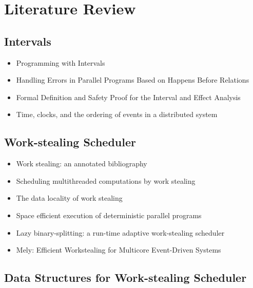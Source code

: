 
\chapter{Literature Review}
\label{cha:literature-review}

\section{Intervals}
\label{sec:lr-intervals}

\begin{itemize}
\item Programming with Intervals \cite{Matsakis2009a}
\item Handling Errors in Parallel Programs Based on Happens Before
  Relations \cite{Matsakis2009b}
\item Formal Definition and Safety Proof for the Interval and Effect
  Analysis \cite{Matsakis2009}
\item Time, clocks, and the ordering of events in a distributed system
  \cite{Lamport1978}
\end{itemize}


\section{Work-stealing Scheduler}
\label{sec:lr-work-stealing-scheduler}

\begin{itemize}
\item Work stealing: an annotated bibliography \cite{Neill}
\item Scheduling multithreaded computations by work stealing
  \cite{Blumofe1999}
\item The data locality of work stealing \cite{Acar2002}
\item Space efficient execution of deterministic parallel programs
  \cite{Simpson1999}
\item Lazy binary-splitting: a run-time adaptive work-stealing
  scheduler \cite{Tzannes2010}
\item Mely: Efficient Workstealing for Multicore Event-Driven Systems
  \cite{Gaud2010}
\end{itemize}


\section{Data Structures for Work-stealing Scheduler}
\label{sec:lr-data-structures-for-work-stealing-scheduler}

